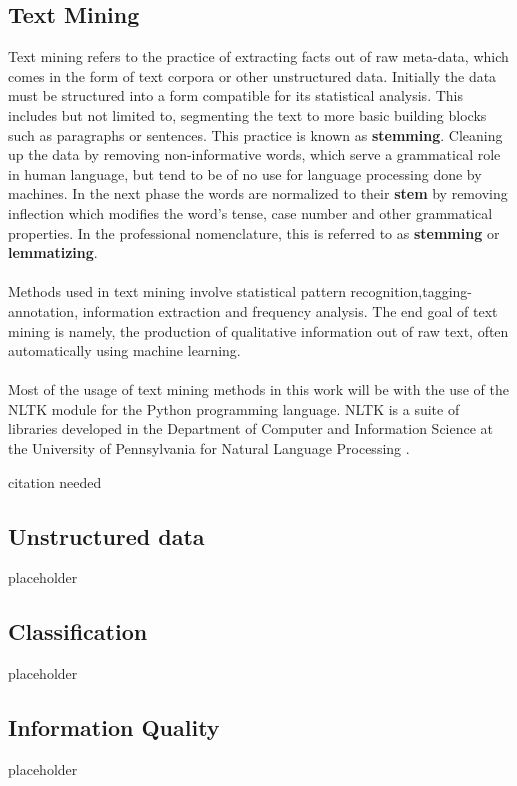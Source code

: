 	\subsection{Text Mining}
		Text mining refers to the practice of extracting facts out of raw meta-data, which comes in the form of text corpora or other unstructured data. Initially the data must be structured into a form compatible for its statistical analysis. This includes but not limited to, segmenting the text to more basic building blocks such as paragraphs or sentences. This practice is known as \textbf{stemming}. Cleaning up the data by removing non-informative words, which serve a grammatical role in human language, but tend to be of no use for language processing done by machines. In the next phase the words are normalized to their \textbf{stem} by removing inflection which modifies the word's tense, case number and other grammatical properties. In the professional nomenclature, this is referred to as \textbf{stemming} or \textbf{lemmatizing}.
		\\~\\
		Methods used in text mining involve statistical pattern recognition,tagging-annotation, information extraction and frequency analysis. The end goal of text mining is namely, the production of qualitative information out of raw text, often automatically using machine learning.
		\\~\\
		Most of the usage of text mining methods in this work will be with the use of the NLTK module for the Python programming language. NLTK is a suite of libraries developed in the Department of Computer and Information Science at the University of Pennsylvania for Natural Language Processing \cite{nltk_book}.
		
		{\color{red} \Large citation needed}
		
	\subsection{Unstructured data}
		{\color{red} \Large placeholder}
		
	\subsection{Classification}
		{\color{red} \Large placeholder}
		
	\subsection{Information Quality}
		{\color{red} \Large placeholder}
